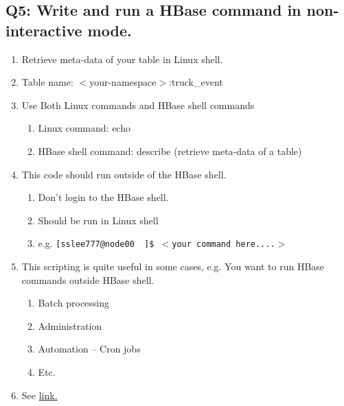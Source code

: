 \documentclass[]{article}
\begin{document}
\subsection*{Q5: Write and run a HBase command in non-interactive mode.} 
\begin{enumerate}[before=\itshape,font=\normalfont,label=\alph*.]
	\item Retrieve meta-data of your table in Linux shell.
	\item Table name: $<$your-namespace$>$:truck\_event
	\item Use Both Linux commands and HBase shell commands
	\begin{enumerate}[label=\roman*.]
		\item Linux command: echo
		\item HBase shell command: describe (retrieve meta-data of a table)
	\end{enumerate}
	\item This code should run outside of the HBase shell.
	\begin{enumerate}[label=\roman*.]
		\item Don’t login to the HBase shell.
		\item Should be run in Linux shell
		\item e.g. \texttt{[sslee777@node00 ~]\$ $<$your command here....$>$}
	\end{enumerate}
	\item This scripting is quite useful in some cases, e.g. You want to run HBase commands outside HBase shell. 
	\begin{enumerate}[label=\roman*.]
		\item Batch processing
		\item Administration
		\item Automation – Cron jobs
		\item Etc.
	\end{enumerate}
	\item See \href{https://hbase.apache.org/book.html#_running_the_shell_in_non_interactive_mode
		and https://hbase.apache.org/book.html#hbase.shell.noninteractive}{link.}
\end{enumerate}
\end{document}
